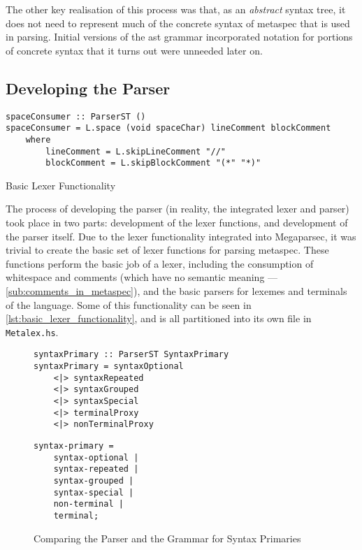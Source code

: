 The other key realisation of this process was that, as an \textit{abstract} syntax tree, it does not need to represent much of the concrete syntax of \gls{metaspec} that is used in parsing. 
Initial versions of the \gls{ast} grammar incorporated notation for portions of concrete syntax that it turns out were unneeded later on. 


\subsection{Developing the Parser} %
\label{sub:developing_the_parser}
\begin{listing}[!htb]
\begin{verbatim}
spaceConsumer :: ParserST ()
spaceConsumer = L.space (void spaceChar) lineComment blockComment
    where
        lineComment = L.skipLineComment "//"
        blockComment = L.skipBlockComment "(*" "*)"
\end{verbatim}
\caption{Basic Lexer Functionality}
\label{lst:basic_lexer_functionality}
\end{listing}

The process of developing the parser (in reality, the integrated lexer and parser) took place in two parts: development of the lexer functions, and development of the parser itself. 
Due to the lexer functionality integrated into Megaparsec, it was trivial to create the basic set of lexer functions for parsing \gls{metaspec}. 
These functions perform the basic job of a lexer, including the consumption of whitespace and comments (which have no semantic meaning --- \autoref{sub:comments_in_metaspec}), and the basic parsers for lexemes and terminals of the language.
Some of this functionality can be seen in \autoref{lst:basic_lexer_functionality}, and is all partitioned into its own file in \texttt{Metalex.hs}.

\begin{figure}[!htb]
\centering
\begin{minipage}{0.65\textwidth}
\centering
\begin{verbatim}
syntaxPrimary :: ParserST SyntaxPrimary
syntaxPrimary = syntaxOptional
    <|> syntaxRepeated
    <|> syntaxGrouped
    <|> syntaxSpecial
    <|> terminalProxy
    <|> nonTerminalProxy
\end{verbatim}
\end{minipage}
\begin{minipage}{0.34\textwidth}
\centering
\begin{verbatim}
syntax-primary = 
    syntax-optional | 
    syntax-repeated |
    syntax-grouped |
    syntax-special |
    non-terminal |
    terminal;
\end{verbatim}
\end{minipage}
\caption{Comparing the Parser and the Grammar for Syntax Primaries}
\label{lst:comparing_the_parser_and_the_grammar_for_syntax_primaries}
\end{figure}

